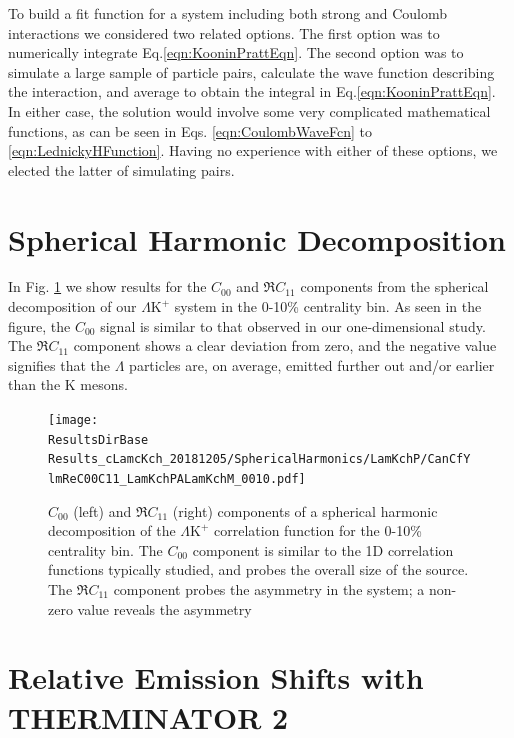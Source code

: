 \documentclass[ALICE,manyauthors]{cernphprep}
\newcommand{\ResultsDirBase}{/home/jesse/Analysis/FemtoAnalysis/Results/}
\newcommand{\Lam}{$\Lambda$\xspace}
\newcommand{\LamKchP}{$\Lambda\mathrm{K^{+}}$\xspace}
\begin{document}
To build a fit function for a system including both strong and Coulomb interactions we considered two related options. 
The first option was to numerically integrate Eq.\ref{eqn:KooninPrattEqn}.  
The second option was to simulate a large sample of particle pairs, calculate the wave function describing the interaction, and average to obtain the integral in Eq.\ref{eqn:KooninPrattEqn}. 
In either case, the solution would involve some very complicated mathematical functions, as can be seen in Eqs. \ref{eqn:CoulombWaveFcn} to \ref{eqn:LednickyHFunction}.
Having no experience with either of these options, we elected the latter of simulating pairs. 




\section{Spherical Harmonic Decomposition}
\label{app:SphericalHarmonics}


In Fig. \ref{fig:LamKchP_ReC00C11_0010} we show results for the $C_{00}$ and $\Re C_{11}$ components from the spherical decomposition of our \LamKchP system in the 0-10\% centrality bin.
As seen in the figure, the $C_{00}$ signal is similar to that observed in our one-dimensional study.
The $\Re C_{11}$ component shows a clear deviation from zero, and the negative value signifies that the \Lam particles are, on average, emitted further out and/or earlier than the K mesons.


\begin{figure}[h!]
  \centering
  \texttt{[image: \\ResultsDirBase Results\_cLamcKch\_20181205/SphericalHarmonics/LamKchP/CanCfYlmReC00C11\_LamKchPALamKchM\_0010.pdf]}
  \caption[\LamKchP $C_{00}$ and $\Re C_{11}$ Spherical Harmonic Components (0-10\%)]{$C_{00}$ (left) and $\Re C_{11}$ (right) components of a spherical harmonic decomposition of the \LamKchP correlation function for the 0-10\% centrality bin.  
The $C_{00}$ component is similar to the 1D correlation functions typically studied, and probes the overall size of the source.
The $\Re C_{11}$ component probes the asymmetry in the system; a non-zero value reveals the asymmetry}
  \label{fig:LamKchP_ReC00C11_0010}
\end{figure}



\section{Relative Emission Shifts with THERMINATOR 2}
\label{app:THERM}
\end{document}
